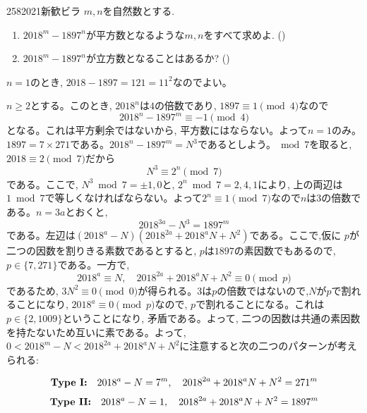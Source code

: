 \begin{prob}{258}{}{2021新歓ビラ}
$m,n$を自然数とする. 
\begin{enumerate}
\item $2018^{m} - 1897^{n}$が平方数となるような$m,n$をすべて求めよ. ()
\item $2018^{m} - 1897^{n}$が立方数となることはあるか? ()
\end{enumerate}
\end{prob}

$n=1$のとき, $2018 - 1897 = 121 = 11^2$なのでよい。\par 
$n\geq 2$とする。このとき, $2018^{n}$は$4$の倍数であり, $1897\equiv 1\pmod{4}$なので
\[2018^{n} - 1897^{m} \equiv -1\pmod{4}\]
となる。これは平方剰余ではないから, 平方数にはならない。よって$n=1$のみ。\\
$1897 = 7\times 271$である。$2018^{n} - 1897^{m} = N^3$であるとしよう。$\bmod{7}$を取ると, $2018 \equiv 2\pmod{7}$だから
\[N^3 \equiv 2^{n}\pmod{7}\]
である。ここで, $N^3\bmod{7}  = \pm 1, 0$と, $2^{n} \bmod{7} = 2,4,1$により, 上の両辺は$1\bmod{7}$で等しくなければならない。よって$2^{n} \equiv  1\pmod{7}$なので$n$は$3$の倍数である。$n=3a$とおくと, 
\[2018^{3a} - N^3 = 1897^{m}\]
である。左辺は$(2018^a - N)(2018^{2a} + 2018^{a}N + N^2)$である。ここで,仮に $p$が二つの因数を割りきる素数であるとすると, $p$は$1897$の素因数でもあるので, $p\in \{ 7,271\}$である。一方で, 
\[2018^{a} \equiv N,\quad 2018^{2a} + 2018^{a}N + N^2 \equiv 0\pmod{p}\]
であるため, $3N^2 \equiv 0\pmod{0}$が得られる。$3$は$p$の倍数ではないので,$N$が$p$で割れることになり, $2018^{a} \equiv 0\pmod{p}$なので, $p$で割れることになる。これは$p\in \{ 2,1009 \}$ということになり, 矛盾である。よって, 二つの因数は共通の素因数を持たないため互いに素である。よって, $0 < 2018^{m} - N < 2018^{2a} + 2018^{a}N + N^2$に注意すると次の二つのパターンが考えられる:
\begin{screen} 
\[\text{\textbf{Type I:}}\quad 2018^{a} - N = 7^{m},\quad 2018^{2a} + 2018^{a}N + N^2 = 271^{m}\]
\[\text{\textbf{Type II:}}\quad 2018^{a} - N = 1,\quad 2018^{2a} + 2018^{a}N + N^2 = 1897^{m}\]
\end{screen}

